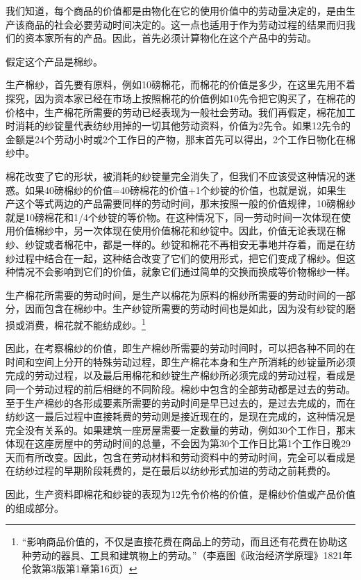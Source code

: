 \documentclass{ctexbook}
\begin{document}
    我们知道，每个商品的价值都是由物化在它的使用价值中的劳动量决定的，是由生产该商品的社会必要劳动时间决定的。这一点也适用于作为劳动过程的结果而归我们的资本家所有的产品。因此，首先必须计算物化在这个产品中的劳动。
    
    假定这个产品是棉纱。
    
    生产棉纱，首先要有原料，例如10磅棉花，而棉花的价值是多少，在这里先用不着探究，因为资本家已经在市场上按照棉花的价值例如10先令把它购买了，在棉花的价格中，生产棉花所需要的劳动已经表现为一般社会劳动。我们再假定，棉花加工时消耗的纱锭量代表纺纱用掉的一切其他劳动资料，价值为2先令。如果12先令的金额是24个劳动小时或2个工作日的产物，那末首先可以得出，2个工作日物化在棉纱中。
    
    棉花改变了它的形状，被消耗的纱锭量完全消失了，但我们不应该受这种情况的迷惑。如果40磅棉纱的价值=40磅棉花的价值+1个纱锭的价值，也就是说，如果生产这个等式两边的产品需要同样的劳动时间，那末按照一般的价值规律，10磅棉纱就是10磅棉花和1/4个纱锭的等价物。在这种情况下，同一劳动时间一次体现在使用价值棉纱中，另一次体现在使用价值棉花和纱锭中。因此，价值无论表现在棉纱、纱锭或者棉花中，都是一样的。纱锭和棉花不再相安无事地并存着，而是在纺纱过程中结合在一起，这种结合改变了它们的使用形式，把它们变成了棉纱。但这种情况不会影响到它们的价值，就象它们通过简单的交换而换成等价物棉纱一样。
    
    生产棉花所需要的劳动时间，是生产以棉花为原料的棉纱所需要的劳动时间的一部分，因而包含在棉纱中。生产纱锭所需要的劳动时间也是如此，因为没有纱锭的磨损或消费，棉花就不能纺成纱。\footnote{“影响商品价值的，不仅是直接花费在商品上的劳动，而且还有花费在协助这种劳动的器具、工具和建筑物上的劳动。”（李嘉图《政治经济学原理》1821年伦敦第3版第1章第16页）}
    
    因此，在考察棉纱的价值，即生产棉纱所需要的劳动时间时，可以把各种不同的在时间和空间上分开的特殊劳动过程，即生产棉花本身和生产所消耗的纱锭量所必须完成的劳动过程，以及最后用棉花和纱锭生产棉纱所必须完成的劳动过程，看成是同一个劳动过程的前后相继的不同阶段。棉纱中包含的全部劳动都是过去的劳动。至于生产棉纱的各形成要素所需要的劳动时间是早已过去的，是过去完成的，而在纺纱这一最后过程中直接耗费的劳动则是接近现在的，是现在完成的，这种情况是完全没有关系的。如果建筑一座房屋需要一定数量的劳动，例如30个工作日，那末体现在这座房屋中的劳动时间的总量，不会因为第30个工作日比第1个工作日晚29天而有所改变。因此，包含在劳动材料和劳动资料中的劳动时间，完全可以看成是在纺纱过程的早期阶段耗费的，是在最后以纺纱形式加进的劳动之前耗费的。
    
    因此，生产资料即棉花和纱锭的表现为12先令价格的价值，是棉纱价值或产品价值的组成部分。
    
\end{document}
